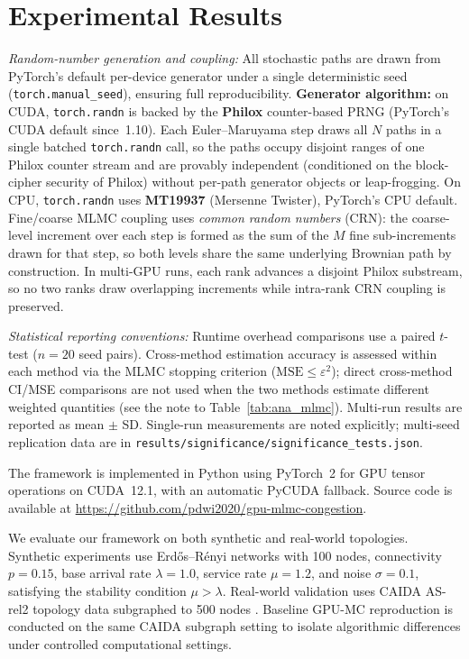 \documentclass{ieeeaccess}
\begin{document}
\section{Experimental Results}
\label{sec:results}

\textit{Random-number generation and coupling:}
All stochastic paths are drawn from PyTorch's default per-device generator under a single
deterministic seed (\texttt{torch.manual\_seed}), ensuring full reproducibility.
\textbf{Generator algorithm:} on CUDA, \texttt{torch.randn} is backed by the \textbf{Philox}
counter-based PRNG \cite{salmon2011random123} (PyTorch's CUDA default since~1.10). Each
Euler--Maruyama step draws all $N$ paths in a single batched \texttt{torch.randn} call, so the
paths occupy disjoint ranges of one Philox counter stream and are provably independent
(conditioned on the block-cipher security of Philox) without per-path generator objects or
leap-frogging. On CPU, \texttt{torch.randn} uses \textbf{MT19937} (Mersenne Twister), PyTorch's
CPU default. Fine/coarse MLMC coupling uses \emph{common random numbers} (CRN): the coarse-level
increment over each step is formed as the sum of the $M$ fine sub-increments drawn for that
step, so both levels share the same underlying Brownian path by construction. In multi-GPU
runs, each rank advances a disjoint Philox substream, so no two ranks draw overlapping
increments while intra-rank CRN coupling is preserved.

\textit{Statistical reporting conventions:}
Runtime overhead comparisons use a paired $t$-test ($n{=}20$ seed pairs). Cross-method
estimation accuracy is assessed within each method via the MLMC stopping criterion
($\mathrm{MSE}\leq\varepsilon^2$); direct cross-method CI/MSE comparisons are not used
when the two methods estimate different weighted quantities (see the note to Table~\ref{tab:ana_mlmc}).
Multi-run results are reported as mean $\pm$ SD. Single-run measurements are noted
explicitly; multi-seed replication data are in
\texttt{results/significance/}\linebreak\texttt{significance\_tests.json}.

The framework is implemented in Python using PyTorch~2 \cite{pytorch2024} for GPU tensor
operations on CUDA~12.1, with an automatic PyCUDA fallback. Source code is available at
\url{https://github.com/pdwi2020/gpu-mlmc-congestion}.

We evaluate our framework on both synthetic and real-world topologies. Synthetic experiments use
Erd\H{o}s--R\'enyi networks with 100 nodes, connectivity $p=0.15$, base arrival rate
$\lambda=1.0$, service rate $\mu=1.2$, and noise $\sigma=0.1$, satisfying the stability
condition $\mu>\lambda$. Real-world validation uses CAIDA AS-rel2 topology data subgraphed to
500 nodes \cite{hofstad2016}. Baseline GPU-MC reproduction is conducted on the same CAIDA
subgraph setting to isolate algorithmic differences under controlled computational settings.
\end{document}
